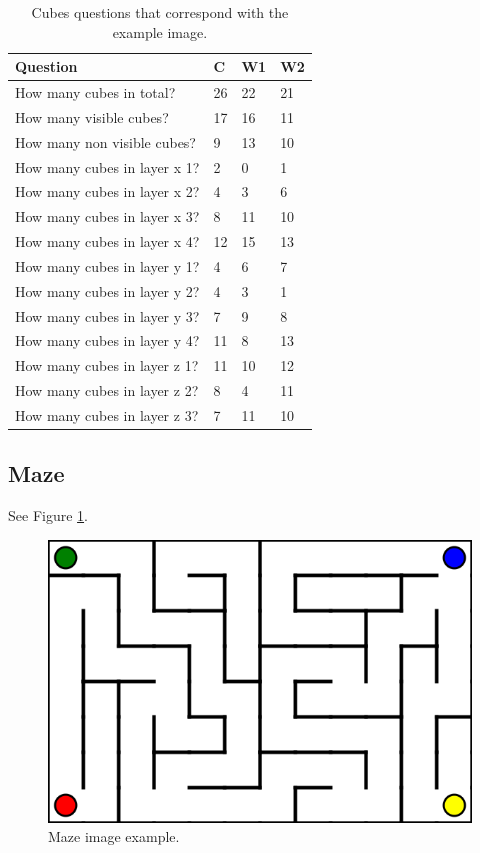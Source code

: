 \documentclass[11pt]{article}
\begin{document}
\begin{table}
\centering
\begin{tabular}{llll}
\toprule
Question                     & C       & W1     & W2     \\ \midrule
How many cubes in total?     & 26      & 22     & 21     \\
How many visible cubes?      & 17      & 16     & 11     \\
How many non visible cubes?  & 9       & 13     & 10     \\ \midrule
How many cubes in layer x 1? & 2       & 0      & 1      \\
How many cubes in layer x 2? & 4       & 3      & 6      \\
How many cubes in layer x 3? & 8       & 11     & 10     \\
How many cubes in layer x 4? & 12      & 15     & 13     \\ \midrule
How many cubes in layer y 1? & 4       & 6      & 7      \\
How many cubes in layer y 2? & 4       & 3      & 1      \\
How many cubes in layer y 3? & 7       & 9      & 8      \\
How many cubes in layer y 4? & 11      & 8      & 13     \\ \midrule
How many cubes in layer z 1? & 11      & 10     & 12     \\
How many cubes in layer z 2? & 8       & 4      & 11     \\
How many cubes in layer z 3? & 7       & 11     & 10     \\ \bottomrule
\end{tabular}
\caption{Cubes questions that correspond with the example image.}
\label{tab:cubes_example}
\end{table}

\subsection{Maze}

See Figure \ref{fig:maze_example}.

\begin{figure}
    \centering
    \includegraphics[width=\linewidth]{maze_0_12_8_0_2.png}
    \caption{Maze image example.}
    \label{fig:maze_example}
\end{figure}
\end{document}
